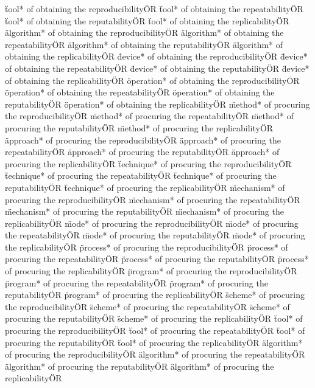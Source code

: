 \documentclass[
10pt, %
a4paper, %
oneside, %
headinclude,footinclude, %
BCOR5mm, %
]{scrartcl}
\begin{document}
\"tool* of obtaining the reproducibility\" OR \"tool* of obtaining the repeatability\" OR \"tool* of obtaining the reputability\" OR \"tool* of obtaining the replicability\" OR 
\"algorithm* of obtaining the reproducibility\" OR \"algorithm* of obtaining the repeatability\" OR \"algorithm* of obtaining the reputability\" OR \"algorithm* of obtaining the replicability\" OR 
\"device* of obtaining the reproducibility\" OR \"device* of obtaining the repeatability\" OR \"device* of obtaining the reputability\" OR \"device* of obtaining the replicability\" OR 
\"operation* of obtaining the reproducibility\" OR \"operation* of obtaining the repeatability\" OR \"operation* of obtaining the reputability\" OR \"operation* of obtaining the replicability\" OR 
\"method* of procuring the reproducibility\" OR \"method* of procuring the repeatability\" OR \"method* of procuring the reputability\" OR \"method* of procuring the replicability\" OR 
\"approach* of procuring the reproducibility\" OR \"approach* of procuring the repeatability\" OR \"approach* of procuring the reputability\" OR \"approach* of procuring the replicability\" OR 
\"technique* of procuring the reproducibility\" OR \"technique* of procuring the repeatability\" OR \"technique* of procuring the reputability\" OR \"technique* of procuring the replicability\" OR 
\"mechanism* of procuring the reproducibility\" OR \"mechanism* of procuring the repeatability\" OR \"mechanism* of procuring the reputability\" OR \"mechanism* of procuring the replicability\" OR 
\"mode* of procuring the reproducibility\" OR \"mode* of procuring the repeatability\" OR \"mode* of procuring the reputability\" OR \"mode* of procuring the replicability\" OR 
\"process* of procuring the reproducibility\" OR \"process* of procuring the repeatability\" OR \"process* of procuring the reputability\" OR \"process* of procuring the replicability\" OR 
\"program* of procuring the reproducibility\" OR \"program* of procuring the repeatability\" OR \"program* of procuring the reputability\" OR \"program* of procuring the replicability\" OR 
\"scheme* of procuring the reproducibility\" OR \"scheme* of procuring the repeatability\" OR \"scheme* of procuring the reputability\" OR \"scheme* of procuring the replicability\" OR 
\"tool* of procuring the reproducibility\" OR \"tool* of procuring the repeatability\" OR \"tool* of procuring the reputability\" OR \"tool* of procuring the replicability\" OR 
\"algorithm* of procuring the reproducibility\" OR \"algorithm* of procuring the repeatability\" OR \"algorithm* of procuring the reputability\" OR \"algorithm* of procuring the replicability\" OR 
\end{document}
